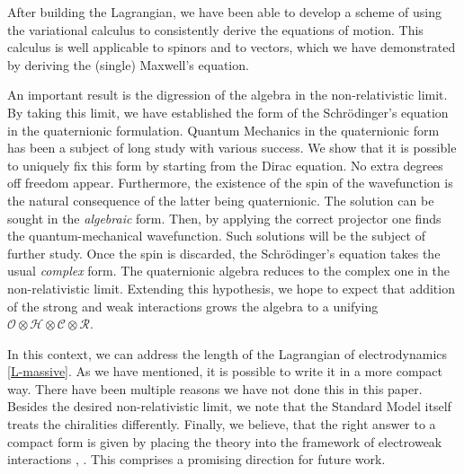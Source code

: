 \documentclass[epsfig,12pt]{article}
\newcommand{\cR}{\mathcal{R}}
\newcommand{\cC}{\mathcal{C}}
\newcommand{\cH}{\mathcal{H}}
\newcommand{\cO}{\mathcal{O}}
\begin{document}
	After building the Lagrangian, we have been able to develop a scheme of using the variational calculus
	to consistently derive the equations of motion.
	This calculus is well applicable to spinors and to vectors, which we have demonstrated by deriving the
	(single) Maxwell's equation.
	
	An important result is the digression of the algebra in the non-relativistic limit.
	By taking this limit, we have established the form of the Schr\"odinger's equation
	in the quaternionic formulation.
	Quantum Mechanics in the quaternionic form has been a subject of long study with various success.
	We show that it is possible to uniquely fix this form by starting from the Dirac equation.
	No extra degrees off freedom appear.
	Furthermore, the existence of the spin of the wavefunction is the natural consequence of the latter
	being quaternionic.
	The solution can be sought in the \emph{algebraic} form.
	Then, by applying the correct projector one finds the quantum-mechanical wavefunction.
	Such solutions will be the subject of further study.
	Once the spin is discarded, the Schr\"odinger's equation takes the usual \emph{complex}
	form.
	The quaternionic algebra reduces to the complex one in the non-relativistic limit.
	Extending this hypothesis, we hope to expect that addition of the strong and weak interactions
	grows the algebra to a unifying $ \cO \otimes \cH \otimes \cC \otimes \cR $.

	In this context, we can address the length of the Lagrangian of electrodynamics \eqref{L-massive}.
	As we have mentioned, it is possible to write it in a more compact way.
	There have been multiple reasons we have not done this in this paper.
	Besides the desired non-relativistic limit, we note that the Standard Model itself treats
	the chiralities differently.
	Finally, we believe, that the right answer to a compact form is given by placing the theory
	into the framework of electroweak interactions \cite{Furey:2015tqa}, \cite{thesis}.
	This comprises a promising direction for future work.




\end{document}
